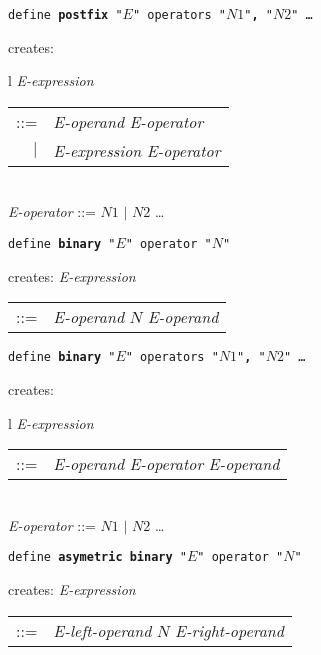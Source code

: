 \documentclass[12pt]{article}
\newcommand{\TT}[1]{{\tt \bfseries #1}}
\newenvironment{indpar}[1][0.3in]%
	{\begin{list}{}%
		     {\setlength{\itemsep}{0in}%
		      \setlength{\topsep}{0in}%
		      \setlength{\parsep}{1ex}%
		      \setlength{\labelwidth}{#1}%
		      \setlength{\leftmargin}{#1}%
		      \addtolength{\leftmargin}{\labelsep}}%
	 \item}%
	{\end{list}}
\begin{document}
\begin{indpar}
{\tt define \TT{postfix} "$E$" operators "$N1$"\TT{,} "$N2$" \ldots}
\begin{indpar}
creates: \begin{tabular}[t]{l}
         {\em E-expression} \begin{tabular}[t]{rl}
                            ::= & {\em E-operand} {\em E-operator} \\
                            $|$ & {\em E-expression} {\em E-operator} \\
                            \end{tabular} \\
         {\em E-operator} ::= $N1$ $|$ $N2$ \ldots \\
	 \end{tabular}
\end{indpar}

{\tt define \TT{binary} "$E$" operator "$N$"}
\begin{indpar}
creates: {\em E-expression} \begin{tabular}[t]{rl}
                            ::= & {\em E-operand} $N$ {\em E-operand} \\
                            \end{tabular}
\end{indpar}

{\tt define \TT{binary} "$E$" operators "$N1$"\TT{,} "$N2$" \ldots}
\begin{indpar}
creates: \begin{tabular}[t]{l}
         {\em E-expression} \begin{tabular}[t]{rl}
                            ::= & {\em E-operand} {\em E-operator}
			          {\em E-operand} \\
                            \end{tabular} \\
         {\em E-operator} ::= $N1$ $|$ $N2$ \ldots \\
	 \end{tabular}
\end{indpar}

{\tt define \TT{asymetric binary} "$E$" operator "$N$"}
\begin{indpar}
creates: {\em E-expression} \begin{tabular}[t]{rl}
                            ::= & {\em E-left-operand} $N$
			          {\em E-right-operand} \\
                            \end{tabular}
\end{indpar}


\end{indpar}
\end{document}
